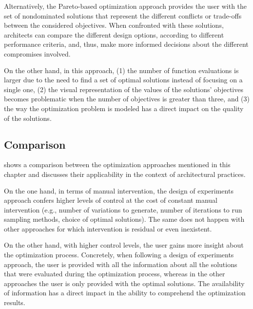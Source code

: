 	Alternatively, the Pareto-based optimization approach provides the user with the set of nondominated solutions that represent the different conflicts or trade-offs between the considered objectives. When confronted with these solutions, architects can compare the different design options, according to different performance criteria, and, thus, make more informed decisions about the different compromises involved. 
	
	On the other hand, in this approach, (1) the number of function evaluations is larger due to the need to find a set of optimal solutions instead of focusing on a single one, (2) the visual representation of the values of the solutions' objectives becomes problematic when the number of objectives is greater than three, and (3) the way the optimization problem is modeled has a direct impact on the quality of the solutions.
	
	
	\subsection{Comparison}
	
	 shows a comparison between the optimization approaches mentioned in this chapter and discusses their applicability in the context of architectural practices.
	 
	On the one hand, in terms of manual intervention, the design of experiments approach confers higher levels of control at the cost of constant manual intervention (e.g., number of variations to generate, number of iterations to run sampling methods, choice of optimal solutions). The same does not happen with other approaches for which intervention is residual or even inexistent.	
	
	On the other hand, with higher control levels, the user gains more insight about the optimization process. Concretely, when following a design of experiments approach, the user is provided with all the information about all the solutions that were evaluated during the optimization process, whereas in the other approaches the user is only provided with the optimal solutions. The availability of information has a direct impact in the ability to comprehend the optimization results.
	
